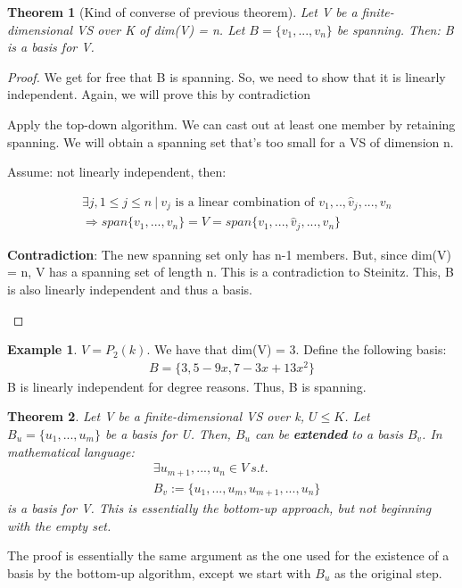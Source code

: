 \documentclass[a4paper, 12pt]{article}
\newtheorem{theorem}{Theorem}
\theoremstyle{definition}
\newtheorem{exmp}{Example}[section]
\theoremstyle{definition}
\theoremstyle{definition}
\theoremstyle{definition}
\newenvironment{itemize_tight}{
	\begin{itemize}
		\setlength{\itemsep}{0pt}
		\setlength{\parskip}{0pt}
	}{\end{itemize}}
\begin{document}
{\begin{theorem}[Kind of converse of previous theorem] 
	Let V be a finite-dimensional VS over K of dim(V) = n. Let $B = \{ v_1,...,v_n \}$ be spanning. Then: B is a basis for V. 
\end{theorem}
\begin{proof}
	We get for free that B is spanning. So, we need to show that it is linearly independent. Again, we will prove this by contradiction
	\begin{itemize_tight}
		\item Apply the top-down algorithm. We can cast out at least one member by retaining spanning. We will obtain a spanning set that's too small for a VS of dimension n. 
		\item Assume: not linearly independent, then: 
	\end{itemize_tight}
	\begin{align*}
		& \exists j, 1 \leq j \leq n\ |\ v_j \mbox{ is a linear combination of } v_1,.., \hat{v}_j,..., v_n \\ 
		& \Rightarrow span\{ v_1,...,v_n \} = V = span \{ v_1,..., \hat{v}_j,...,v_n \} 
	\end{align*}
	\begin{itemize_tight}
		\item \textbf{Contradiction}: The new spanning set only has n-1 members. But, since dim(V) = n, V has a spanning set of length n. This is a contradiction to Steinitz. This, B is also linearly independent and thus a basis. 
	\end{itemize_tight}
	
\end{proof} 

\begin{exmp}
	$V = P_2(k)$. We have that dim(V) = 3. Define the following basis: 
	\begin{align*}
		B = \{ 3, 5-9x, 7-3x+13x^2 \} 
	\end{align*}
	B is linearly independent for degree reasons. Thus, B is spanning. 
\end{exmp}

\begin{theorem}
	Let V be a finite-dimensional VS over k, $U \leq K$. Let $B_u = \{ u_1, ...,u_m \}$ be a basis for U. Then, $B_u$ can be \textbf{extended} to a basis $B_v$. In mathematical language: 
	\begin{align*}
		& \exists u_{m+1},..., u_n \in V\ s.t. \\
		& B_v := \{ u_1, ..., u_m, u_{m+1}, ..., u_n \} 
	\end{align*}
	is a basis for V. This is essentially the bottom-up approach, but not beginning with the empty set. 
\end{theorem}
The proof is essentially the same argument as the one used for the existence of a basis by the bottom-up algorithm, except we start with $B_u$ as the original step. 

}
\end{document}
